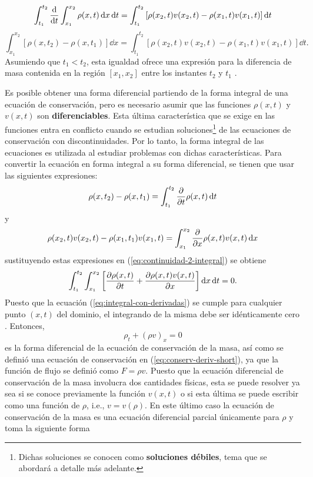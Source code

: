 \begin{equation}
	\int_{t_1}^{t_2}\dv{t}\int_{x_1}^{x_2}\rho(x,t)\dd{x}\dd{t}  = \int_{t_1}^{t_2}\left[\rho(x_2,t)v(x_2,t) - \rho(x_1,t)v(x_1,t)\right]\dd{t}
\end{equation}
\begin{equation}
	\int_{x_1}^{x_2}[\rho(x,t_2) - \rho(x,t_1)]\dd{x}  = \int_{t_1}^{t_2}\left[\rho(x_2,t)v(x_2,t) - \rho(x_1,t)v(x_1,t)\right]\dd{t} 
	\label{eq:continuidad-2-integral}.
\end{equation}
Asumiendo que $t_1<t_2$, esta igualdad ofrece una expresión para la diferencia de masa contenida en la región $[x_1,x_2]$ entre los instantes $t_2$ y $t_1$ \cite{Leveque}. 

Es posible obtener una forma diferencial partiendo de la forma integral de una ecuación de conservación, pero es necesario asumir que las funciones $\rho(x,t)$ y $v(x,t)$ son \textbf{diferenciables}. Esta última característica que se exige en las funciones entra en conflicto cuando se estudian soluciones\footnote{Dichas soluciones se conocen como \textbf{soluciones débiles}, tema que se abordará a detalle más adelante.} de las ecuaciones de conservación con discontinuidades. Por lo tanto, la forma integral de las ecuaciones es utilizada al estudiar problemas con dichas características. Para convertir la ecuación en forma integral a su forma diferencial, se tienen que usar las siguientes expresiones:
\begin{equation}
	\rho(x,t_2)-\rho(x,t_1) = \int_{t_1}^{t_2}\pdv{t}\rho(x,t)\dd{t}
\end{equation}
y
\begin{equation}
	\rho(x_2,t)v(x_2,t)-\rho(x_1,t_1)v(x_1,t) = \int_{x_1}^{x_2}\pdv{x}\rho(x,t)v(x,t)\dd{x}
\end{equation}
sustituyendo estas expresiones en (\ref{eq:continuidad-2-integral}) se obtiene
\begin{equation}
	\int_{t_1}^{t_2}\int_{x_1}^{x_2}\left[\pdv{\rho(x,t)}{t} + \pdv{\rho(x,t)v(x,t)}{x}\right]\dd{x}\dd{t} = 0.
	\label{eq:integral-con-derivadas}
\end{equation}
Puesto que la ecuación (\ref{eq:integral-con-derivadas}) se cumple para cualquier punto $(x,t)$ del dominio, el integrando de la misma debe ser idénticamente cero \cite{Leveque}. Entonces,
\begin{equation}
	\rho_{t} + (\rho v)_{x} = 0
\end{equation}
es la forma diferencial de la ecuación de conservación de la masa, así como se definió una ecuación de conservación en (\ref{eq:conserv-deriv-short}), ya que la función de flujo se definió como $F = \rho v$. Puesto que la ecuación diferencial de conservación de la masa involucra dos cantidades físicas, esta se puede resolver ya sea si se conoce previamente la función $v(x,t)$ o si esta última se puede escribir como una función de $\rho$, i.e., $v=v(\rho)$. En este último caso la ecuación de conservación de la masa es una ecuación diferencial parcial únicamente para $\rho$ \cite{Leveque} y toma la siguiente forma
